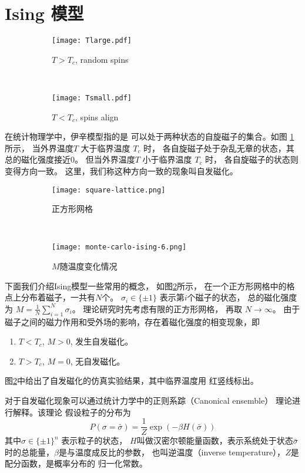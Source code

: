 \section{Ising 模型}\label{sec:ising}
\begin{figure}
	\centering
	\begin{subfigure}{0.5\textwidth}
		\texttt{[image: Tlarge.pdf]}
		\caption{$T>T_c$, random spins}
	\end{subfigure}~
	\begin{subfigure}{0.5\textwidth}
		\texttt{[image: Tsmall.pdf]}
		\caption{$T<T_c$, spins align}
	\end{subfigure}
  \caption{}\label{fig:ising_two_configurations}
\end{figure}    

在统计物理学中，伊辛模型指的是
可以处于两种状态的自旋磁子的集合。如图
\ref{fig:ising_two_configurations} 所示，
当外界温度$T$
大于临界温度 $T_c$ 时，
各自旋磁子处于杂乱无章的状态，其总的磁化强度接近0。
但当外界温度$T$
小于临界温度 $T_c$ 时，
各自旋磁子的状态则变得方向一致。
这里，我们称这种方向一致的现象叫自发磁化。

\begin{figure}
	\centering
	\begin{subfigure}{0.45\textwidth}
		\texttt{[image: square-lattice.png]}
		\caption{正方形网格}\label{fig:square_lattice}
	\end{subfigure}~
	\begin{subfigure}{0.53\textwidth}
		\texttt{[image: monte-carlo-ising-6.png]}
		\caption{$M$随温度变化情况}
	\end{subfigure}
  \caption{}
\end{figure}

下面我们介绍Ising模型一些常用的概念，
如图\ref{fig:square_lattice}所示，
在一个正方形网格中的格点上分布着磁子，一共有$N$个。
$\sigma_i \in \{ \pm 1\} $ 表示第$i$个磁子的状态，
总的磁化强度为 $M = \frac{1}{N} \sum_{i=1}^N \sigma_i$。
理论研究时先考虑有限的正方形网格， 再取 $N\to \infty$。
由于磁子之间的磁力作用和受外场的影响，存在着磁化强度的相变现象，即
\begin{enumerate}
		\item $T< T_c$, $M>0$, 发生自发磁化。
		\item $T> T_c$, $M=0$, 无自发磁化。
\end{enumerate}
图\ref{fig:square_lattice}中给出了自发磁化的仿真实验结果，其中临界温度用
红竖线标出。

对于自发磁化现象可以通过统计力学中的正则系踪（Canonical ensemble）
理论进行解释。该理论
假设粒子的分布为
\begin{equation}\label{eq:canonical_ensemble}
P(\sigma = \bar{\sigma}) = \frac{1}{Z} \exp(-\beta H(\bar{\sigma}))
\end{equation}
其中$\sigma \in \{\pm 1\}^n$ 表示粒子的状态，
$H$叫做汉密尔顿能量函数，表示系统处于状态$\bar{\sigma}$时的总能量，$\beta$是与温度成反比的参数，
也叫逆温度（inverse temperature），$Z$是配分函数，是概率分布的
归一化常数。

